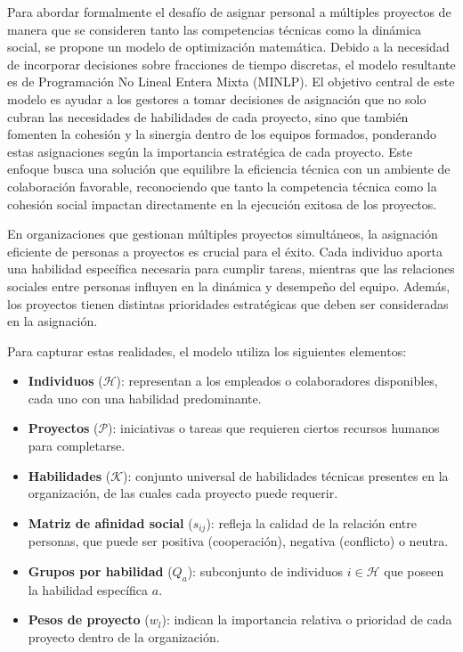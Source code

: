\documentclass[conference]{IEEEtran}
\begin{document}
Para abordar formalmente el desafío de asignar personal a múltiples proyectos de manera que se consideren tanto las competencias técnicas como la dinámica social, se propone un modelo de optimización matemática. Debido a la necesidad de incorporar decisiones sobre fracciones de tiempo discretas, el modelo resultante es de Programación No Lineal Entera Mixta (MINLP). El objetivo central de este modelo es ayudar a los gestores a tomar decisiones de asignación que no solo cubran las necesidades de habilidades de cada proyecto, sino que también fomenten la cohesión y la sinergia dentro de los equipos formados, ponderando estas asignaciones según la importancia estratégica de cada proyecto. Este enfoque busca una solución que equilibre la eficiencia técnica con un ambiente de colaboración favorable, reconociendo que tanto la competencia técnica como la cohesión social impactan directamente en la ejecución exitosa de los proyectos.

En organizaciones que gestionan múltiples proyectos simultáneos, la asignación eficiente de personas a proyectos es crucial para el éxito. Cada individuo aporta una habilidad específica necesaria para cumplir tareas, mientras que las relaciones sociales entre personas influyen en la dinámica y desempeño del equipo. Además, los proyectos tienen distintas prioridades estratégicas que deben ser consideradas en la asignación.

Para capturar estas realidades, el modelo utiliza los siguientes elementos:

\begin{itemize}
    \item \textbf{Individuos} (\(\mathcal{H}\)): representan a los empleados o colaboradores disponibles, cada uno con una habilidad predominante.
    \item \textbf{Proyectos} (\(\mathcal{P}\)): iniciativas o tareas que requieren ciertos recursos humanos para completarse.
    \item \textbf{Habilidades} (\(\mathcal{K}\)): conjunto universal de habilidades técnicas presentes en la organización, de las cuales cada proyecto puede requerir.
    \item \textbf{Matriz de afinidad social} (\(s_{ij}\)): refleja la calidad de la relación entre personas, que puede ser positiva (cooperación), negativa (conflicto) o neutra.
    \item \textbf{Grupos por habilidad} (\(Q_a\)): subconjunto de individuos \(i \in \mathcal{H}\) que poseen la habilidad específica \(a\).
    \item \textbf{Pesos de proyecto} (\(w_l\)): indican la importancia relativa o prioridad de cada proyecto dentro de la organización.
\end{itemize}
\end{document}
